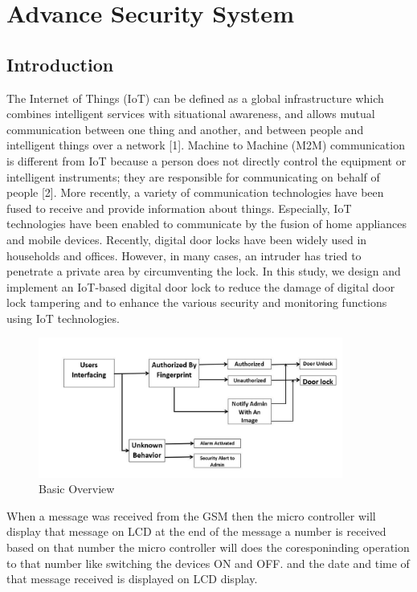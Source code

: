 \documentclass[twoside,a4paper,16pt]{book}
\begin{document}
{\newpage
\chapter{Advance Security System}
\section{Introduction}
The Internet of Things (IoT) can be defined as a global infrastructure which combines
intelligent services with situational awareness, and allows mutual communication
between one thing and another, and between people and intelligent things over a network
[1]. Machine to Machine (M2M) communication is different from IoT because a person
does not directly control the equipment or intelligent instruments; they are responsible for
communicating on behalf of people [2].
More recently, a variety of communication technologies have been fused to receive and
provide information about things. Especially, IoT technologies have been enabled to
communicate by the fusion of home appliances and mobile devices.
Recently, digital door locks have been widely used in households and offices.
However, in many cases, an intruder has tried to penetrate a private area by circumventing
the lock. In this study, we design and implement an IoT-based digital door lock to reduce
the damage of digital door lock tampering and to enhance the various security and
monitoring functions using IoT technologies.

\begin{figure}[ht!]
	\begin{center}
		\includegraphics[width=10.0cm]{b1.jpg}
		\caption{Basic Overview}
	\end{center}
\end{figure}
When a message was received from the GSM then the micro controller will display that message on LCD at the end
of the message a number is received based on that number the micro controller will does the coresponinding operation
to that number like switching the devices ON and OFF. and the date and time of that message received is displayed
on LCD display.
}
\end{document}
